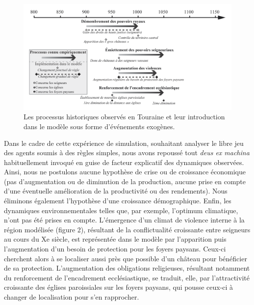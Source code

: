\begin{figure}[!h]
	\centering
	\includegraphics[width=1\linewidth]{src/Chapitre_TMD/Fig2}
	\caption{Les processus historiques observés en Touraine et leur introduction dans le modèle sous forme d’événements exogènes.}
	\label{fig:fig2}
\end{figure}

Dans le cadre de cette expérience de simulation, souhaitant analyser le libre jeu des agents soumis à des règles simples, nous avons repoussé tout \textit{deus ex machina} habituellement invoqué en guise de facteur explicatif des dynamiques observées.
Ainsi, nous ne postulons aucune hypothèse de crise ou de croissance économique (pas d'augmentation ou de diminution de la production, aucune prise en compte d'une éventuelle amélioration de la productivité ou des rendements).
Nous éliminons également l'hypothèse d'une croissance démographique.
Enfin, les dynamiques environnementales telles que, par exemple, l'optimum climatique, n'ont pas été prises en compte.
L'émergence d'un climat de violence interne à la région modélisée (figure 2), résultant de la conflictualité croissante entre seigneurs au cours du Xe siècle, est représentée dans le modèle par l'apparition puis l'augmentation d'un besoin de protection pour les foyers paysans.
Ceux-ci cherchent alors à se localiser aussi près que possible d'un château pour bénéficier de sa protection.
L'augmentation des obligations religieuses, résultant notamment du renforcement de l'encadrement ecclésiastique, se traduit, elle, par l'attractivité croissante des églises paroissiales sur les foyers paysans, qui pousse ceux-ci à changer de localisation pour s'en rapprocher.

